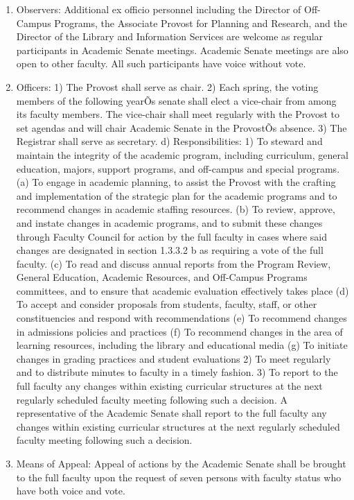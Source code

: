 \documentclass[letterpaper, 11pt]{article}
\begin{document}
\begin{enumerate}[label=\alph*)]
					\item{Observers:  Additional ex officio personnel including the Director of Off-Campus Programs, the Associate Provost for Planning and Research, and the Director of the Library and Information Services are welcome as regular participants in Academic Senate meetings.  Academic Senate meetings are also open to other faculty.  All such participants have voice without vote.}
					\item{Officers:}
					1) The Provost shall serve as chair.
					2) Each spring, the voting members of the following yearÕs senate shall elect a vice-chair from among its faculty members.  The vice-chair shall meet regularly with the Provost to set agendas and will chair Academic Senate in the ProvostÕs absence.
					3) The Registrar shall serve as secretary.
					d) Responsibilities:
					1) To steward and maintain the integrity of the academic program, including curriculum, general education, majors, support programs, and off-campus and special programs.
					(a) To engage in academic planning, to assist the Provost with the crafting and implementation of the strategic plan for the academic programs and to recommend changes in academic staffing resources.
					(b) To review, approve, and instate changes in academic programs, and to submit these changes through Faculty Council for action by the full faculty in cases where said changes are designated in section 1.3.3.2 b as requiring a vote of the full faculty.
					(c) To read and discuss annual reports from the Program Review, General Education, Academic Resources, and Off-Campus Programs committees, and to ensure that academic evaluation effectively takes place
					(d) To accept and consider proposals from students, faculty, staff, or other constituencies and respond with recommendations
					(e) To recommend changes in admissions policies and practices
					(f) To recommend changes in the area of learning resources, including the library and educational media
					(g) To initiate changes in grading practices and student evaluations
					2) To meet regularly and to distribute minutes to faculty in a timely fashion.
					3) To report to the full faculty any changes within existing curricular structures at the next regularly scheduled faculty meeting following such a decision. A representative of the Academic Senate shall report to the full faculty any changes within existing curricular structures at the next regularly scheduled faculty meeting following such a decision.
					\item{Means of Appeal:  Appeal of actions by the Academic Senate shall be brought to the full faculty upon the request of seven persons with faculty status who have both voice and vote.}

\end{enumerate}
\end{document}
